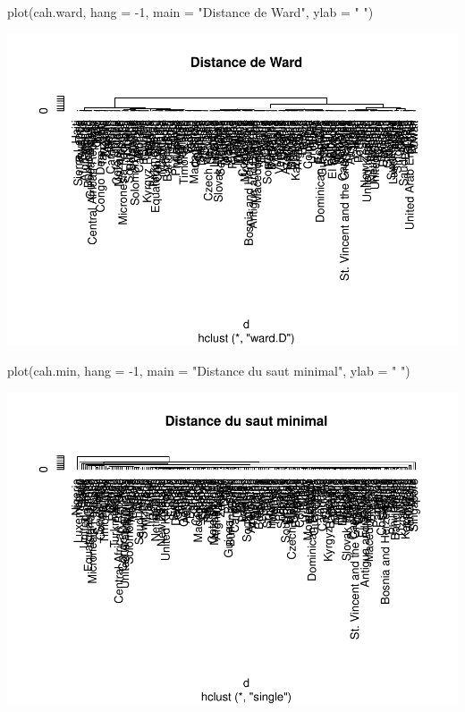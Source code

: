 \documentclass[
]{article}
\newenvironment{Shaded}{}{}
\newcommand{\AttributeTok}[1]{#1}
\newcommand{\DecValTok}[1]{#1}
\newcommand{\FunctionTok}[1]{#1}
\newcommand{\NormalTok}[1]{#1}
\newcommand{\SpecialCharTok}[1]{\textcolor[rgb]{0.00,0.50,0.50}{#1}}
\newcommand{\StringTok}[1]{\textcolor[rgb]{0.00,0.50,0.50}{#1}}
\begin{document}
\begin{Shaded}
\begin{Highlighting}[]
\FunctionTok{plot}\NormalTok{(cah.ward, }\AttributeTok{hang =} \SpecialCharTok{{-}}\DecValTok{1}\NormalTok{, }\AttributeTok{main =} \StringTok{"Distance de Ward"}\NormalTok{, }\AttributeTok{ylab =} \StringTok{" "}\NormalTok{)}
\end{Highlighting}
\end{Shaded}

\includegraphics{projet_classification_files/figure-latex/unnamed-chunk-13-1.pdf}

\begin{Shaded}
\begin{Highlighting}[]
\FunctionTok{plot}\NormalTok{(cah.min, }\AttributeTok{hang =} \SpecialCharTok{{-}}\DecValTok{1}\NormalTok{, }\AttributeTok{main =} \StringTok{"Distance du saut minimal"}\NormalTok{, }\AttributeTok{ylab =} \StringTok{" "}\NormalTok{)}
\end{Highlighting}
\end{Shaded}

\includegraphics{projet_classification_files/figure-latex/unnamed-chunk-14-1.pdf}
\end{document}
